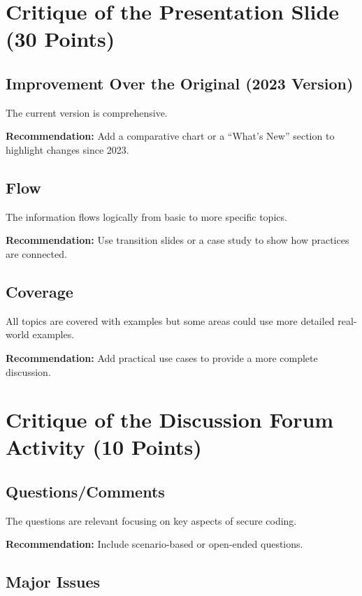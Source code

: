 \documentclass{article}
\begin{document}
\section{Critique of the Presentation Slide (30 Points)}

\subsection{Improvement Over the Original (2023 Version)}

The current version is comprehensive. 

\textbf{Recommendation:} Add a comparative chart or a “What’s New” section to highlight changes since 2023.

\subsection{Flow}

The information flows logically from basic to more specific topics.

\textbf{Recommendation:} Use transition slides or a case study to show how practices are connected.

\subsection{Coverage}

All topics are covered with examples but some areas could use more detailed real-world examples.

\textbf{Recommendation:} Add practical use cases to provide a more complete discussion.

\section{Critique of the Discussion Forum Activity (10 Points)}

\subsection{Questions/Comments}

The questions are relevant focusing on key aspects of secure coding.

\textbf{Recommendation:} Include scenario-based or open-ended questions.

\subsection{Major Issues}
\end{document}
